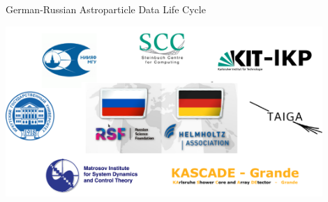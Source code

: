 \begin{frame}{German-Russian Astroparticle Data Life Cycle}
\vspace{-1.4em}
\begin{center}
  \includegraphics[width=0.9\textwidth]{pics/Collab.pdf}
\end{center}

\vspace{-1em}
\end{frame}

